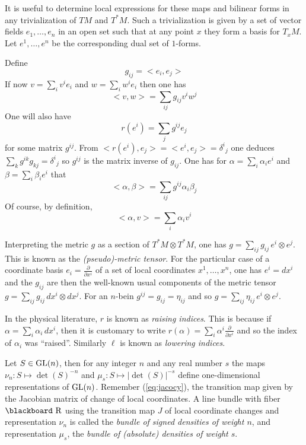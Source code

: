 \documentclass[12pt,titlepage]{article}
\def\bbf#1{\hbox{\blackboard #1}}
\def\lR{\bbf R}
\def\GL{\hbox{GL}}
\def\ppv#1#2{\frac{\partial}{\partial #1^#2}}
\begin{document}
It is useful to determine local expressions for these maps and bilinear
forms in any  trivialization of \(TM\) and \(T^*M\).  Such a 
trivialization is given by a set of vector fields \(e_1,\dots,e_n\) in an 
open set such that at any point \(x\) they form a basis for \(T_xM\). Let 
\(e^1,\dots,e^n\) be the corresponding dual set of \(1\)-forms. 

Define
\[
g_{ij} = <e_i,e_j>
\]
%
If now \(v=\sum_i v^ie_i\) and \(w = \sum_iw^ie_i\) then
one has 
\[
<v,w> = \sum_{ij}g_{ij}v^iw^j
\]
 One will also have 
\[
r(e^i)
= \sum_j g^{ij}e_j
\]
 for some matrix \(g^{ij}\).
% 
From \(<r(e^i),e_j> = <e^i,e_j> = \delta^i{}_j\)
 one deduces \(\sum_k g^{ik}g_{kj} = \delta^i{}_j\)
so \(g^{ij}\) is the matrix inverse
of \(g_{ij}\). One has for \(\alpha = \sum_i\alpha_ie^i\) and \(\beta =
\sum_i\beta_ie^i\) that 
\[
<\alpha,\beta> =
\sum_{ij}g^{ij}\alpha_i\beta_j
\]
 Of course, by definition, 
\[
<\alpha,v> =
\sum_i\alpha_iv^i
\]

Interpreting the metric \(g\) as a section of \(T^*M\otimes T^*M\), one has
\(g=\sum_{ij}g_{ij}\,e^i\otimes e^j\). This is known as the 
{\em (pseudo)-metric tensor\/}. 
%
For the particular case of a coordinate basis \(e_i = \ppv{x}{i}\) 
of a set 
of local coordinates \(x^1,\dots,x^n\),
  one has \(e^i=dx^i\) and the \(g_{ij}\) are then the well-known usual
components of the  metric tensor
 \(g=\sum_{ij}g_{ij}\,dx^i\otimes dx^j\). For 
an \(n\)-bein \(g^{ij}=g_{ij}=\eta_{ij}\) 
and so \(g=\sum_{ij}\eta_{ij}\,e^i\otimes e^j\).

In the physical literature, \(r\)  is known as {\em
raising indices\/}.
%
 This is because if
\(\alpha=\sum_i\alpha_i\,dx^i\), then it is customary to write
\(r(\alpha) = \sum_i\alpha^i\ppv{x}{i}\) and so the index of
\(\alpha_i\) was ``raised''. Similarly \(\ell\) is known as 
%
{\em lowering
indices\/}.

Let \(S\in \GL(n)\), then for any integer \(n\) and any real number
\(s\) the maps \(\nu_n : S \mapsto \det (S)^{-n}\) and \(\mu_s:S
\mapsto |\det (S)|^{-s}\) define one-dimensional representations of
\(\GL(n)\). 
Remember (\ref{eq:jacocy}), the transition map given by the
Jacobian matrix of change of local coordinates.
A line bundle with fiber \(\lR\) using the transition map
\(J\) of local coordinate changes and representation \(\nu_n\) is called
the {\em bundle of signed
densities of weight \(n\)\/},
%
%
 and representation \(\mu_s\), the {\em
bundle of (absolute) densities of weight \(s\)\/}.
%
%
\end{document}
